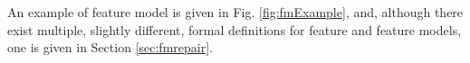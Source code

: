 
An example of feature model is given in Fig. \ref{fig:fmExample}, and, although there exist multiple, slightly different, formal definitions for feature and feature models, one is given in Section \ref{sec:fmrepair}.

